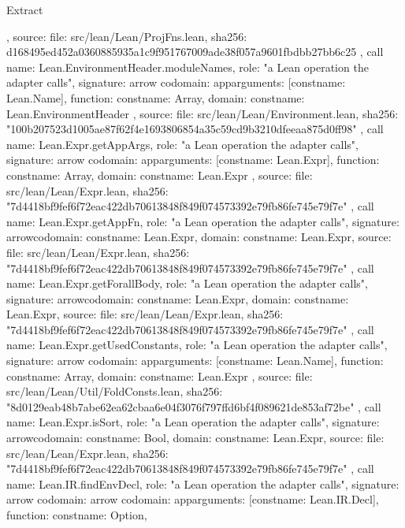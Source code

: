 \begin{lexlean}{Extract}
\begin{toolingmodule}
{{{      },
      source: {
        file: src/lean/Lean/ProjFns.lean,
        sha256: d168495ed452a0360885935a1c9f951767009ade38f057a9601fbdbb27bb6c25
      }
    },
    call{
      name: Lean.EnvironmentHeader.moduleNames,
      role: "a Lean operation the adapter calls",
      signature: arrow{
        codomain: app{arguments: [const{name: Lean.Name}], function: const{name: Array}},
        domain: const{name: Lean.EnvironmentHeader}
      },
      source: {
        file: src/lean/Lean/Environment.lean,
        sha256: "100b207523d1005ae87f62f4e1693806854a35c59cd9b3210dfeeaa875d0ff98"
      }
    },
    call{
      name: Lean.Expr.getAppArgs,
      role: "a Lean operation the adapter calls",
      signature: arrow{
        codomain: app{arguments: [const{name: Lean.Expr}], function: const{name: Array}},
        domain: const{name: Lean.Expr}
      },
      source: {
        file: src/lean/Lean/Expr.lean,
        sha256: "7d4418bf9fef6f72eac422db70613848f849f074573392e79fb86fe745e79f7e"
      }
    },
    call{
      name: Lean.Expr.getAppFn,
      role: "a Lean operation the adapter calls",
      signature: arrow{codomain: const{name: Lean.Expr}, domain: const{name: Lean.Expr}},
      source: {
        file: src/lean/Lean/Expr.lean,
        sha256: "7d4418bf9fef6f72eac422db70613848f849f074573392e79fb86fe745e79f7e"
      }
    },
    call{
      name: Lean.Expr.getForallBody,
      role: "a Lean operation the adapter calls",
      signature: arrow{codomain: const{name: Lean.Expr}, domain: const{name: Lean.Expr}},
      source: {
        file: src/lean/Lean/Expr.lean,
        sha256: "7d4418bf9fef6f72eac422db70613848f849f074573392e79fb86fe745e79f7e"
      }
    },
    call{
      name: Lean.Expr.getUsedConstants,
      role: "a Lean operation the adapter calls",
      signature: arrow{
        codomain: app{arguments: [const{name: Lean.Name}], function: const{name: Array}},
        domain: const{name: Lean.Expr}
      },
      source: {
        file: src/lean/Lean/Util/FoldConsts.lean,
        sha256: "8d0129eab48b7abe62ea62cbaa6e04f3076f797ffd6bf4f089621de853af72be"
      }
    },
    call{
      name: Lean.Expr.isSort,
      role: "a Lean operation the adapter calls",
      signature: arrow{codomain: const{name: Bool}, domain: const{name: Lean.Expr}},
      source: {
        file: src/lean/Lean/Expr.lean,
        sha256: "7d4418bf9fef6f72eac422db70613848f849f074573392e79fb86fe745e79f7e"
      }
    },
    call{
      name: Lean.IR.findEnvDecl,
      role: "a Lean operation the adapter calls",
      signature: arrow{
        codomain: arrow{
          codomain: app{arguments: [const{name: Lean.IR.Decl}], function: const{name: Option}},
}}}}
\end{toolingmodule}
\end{lexlean}
